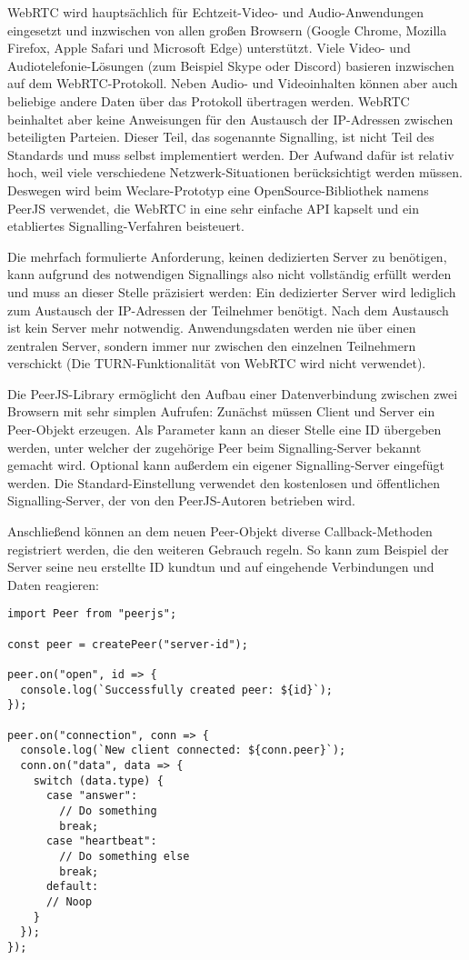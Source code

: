 WebRTC wird hauptsächlich für Echtzeit-Video- und Audio-Anwendungen eingesetzt und inzwischen von allen großen Browsern (Google Chrome, Mozilla Firefox, Apple Safari und Microsoft Edge) unterstützt. Viele Video- und Audiotelefonie-Lösungen (zum Beispiel Skype oder Discord) basieren inzwischen auf dem WebRTC-Protokoll. Neben Audio- und Videoinhalten können aber auch beliebige andere Daten über das Protokoll übertragen werden. WebRTC beinhaltet aber keine Anweisungen für den Austausch der IP-Adressen zwischen beteiligten Parteien. Dieser Teil, das sogenannte Signalling, ist nicht Teil des Standards und muss selbst implementiert werden. Der Aufwand dafür ist relativ hoch, weil viele verschiedene Netzwerk-Situationen berücksichtigt werden müssen. Deswegen wird beim Weclare-Prototyp eine OpenSource-Bibliothek namens PeerJS\cite{web:peerjs} verwendet, die WebRTC in eine sehr einfache API kapselt und ein etabliertes Signalling-Verfahren beisteuert.

Die mehrfach formulierte Anforderung, keinen dedizierten Server zu benötigen, kann aufgrund des notwendigen Signallings also nicht vollständig erfüllt werden und muss an dieser Stelle präzisiert werden: Ein dedizierter Server wird lediglich zum Austausch der IP-Adressen der Teilnehmer benötigt. Nach dem Austausch ist kein Server mehr notwendig. Anwendungsdaten werden nie über einen zentralen Server, sondern immer nur zwischen den einzelnen Teilnehmern verschickt (Die TURN-Funktionalität von WebRTC wird nicht verwendet).

Die PeerJS-Library ermöglicht den Aufbau einer Datenverbindung zwischen zwei Browsern mit sehr simplen Aufrufen: Zunächst müssen Client und Server ein Peer-Objekt erzeugen. Als Parameter kann an dieser Stelle eine ID übergeben werden, unter welcher der zugehörige Peer beim Signalling-Server bekannt gemacht wird. Optional kann außerdem ein eigener Signalling-Server eingefügt werden. Die Standard-Einstellung verwendet den kostenlosen und öffentlichen Signalling-Server, der von den PeerJS-Autoren betrieben wird.

Anschließend können an dem neuen Peer-Objekt diverse Callback-Methoden registriert werden, die den weiteren Gebrauch regeln. So kann zum Beispiel der Server seine neu erstellte ID kundtun und auf eingehende Verbindungen und Daten reagieren:

\begin{minipage}{\linewidth}
\begin{lstlisting}[caption={Verbindungsaufbau mit der PeerJS-Bibliothek auf der Server-Seite. (aus: src/server/actions/server.js)}]
import Peer from "peerjs";

const peer = createPeer("server-id");

peer.on("open", id => {
  console.log(`Successfully created peer: ${id}`);
});

peer.on("connection", conn => {
  console.log(`New client connected: ${conn.peer}`);
  conn.on("data", data => {
    switch (data.type) {
      case "answer":
        // Do something
        break;
      case "heartbeat":
        // Do something else
        break;
      default:
      // Noop
    }
  });
});
\end{lstlisting}
\end{minipage}

